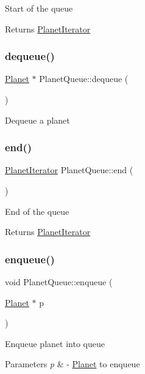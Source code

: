 Start of the queue \begin{DoxyReturn}{Returns}
\hyperlink{classPlanetIterator}{Planet\+Iterator} 
\end{DoxyReturn}
\mbox{\label{classPlanetQueue_a9d64880eea8788b78ebb1b2f430f9f1f}} 
\subsubsection{\texorpdfstring{dequeue()}{dequeue()}}
{\footnotesize\ttfamily \hyperlink{classPlanet}{Planet} $\ast$ Planet\+Queue\+::dequeue (\begin{DoxyParamCaption}{ }\end{DoxyParamCaption})}

Dequeue a planet \mbox{\label{classPlanetQueue_a587798b5e8ce4c647804379abbbcfd26}} 
\subsubsection{\texorpdfstring{end()}{end()}}
{\footnotesize\ttfamily \hyperlink{classPlanetIterator}{Planet\+Iterator} Planet\+Queue\+::end (\begin{DoxyParamCaption}{ }\end{DoxyParamCaption})}

End of the queue \begin{DoxyReturn}{Returns}
\hyperlink{classPlanetIterator}{Planet\+Iterator} 
\end{DoxyReturn}
\mbox{\label{classPlanetQueue_a6876331ffc6b56a0e960e0be397babbb}} 
\subsubsection{\texorpdfstring{enqueue()}{enqueue()}}
{\footnotesize\ttfamily void Planet\+Queue\+::enqueue (\begin{DoxyParamCaption}\item[{\hyperlink{classPlanet}{Planet} $\ast$}]{p }\end{DoxyParamCaption})}

Enqueue planet into queue 
\begin{DoxyParams}{Parameters}
{\em p} & -\/ \hyperlink{classPlanet}{Planet} to enqueue \\
\hline
\end{DoxyParams}
\mbox{\label{classPlanetQueue_a50400f0c70785492f23f2703d9eac0cc}} 
